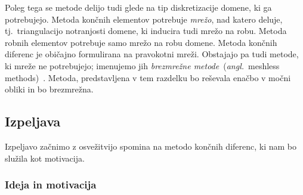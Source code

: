 \documentclass[12pt,a4paper,twoside]{article}
\theoremstyle{definition} %
\theoremstyle{plain} %
\numberwithin{equation}{section}
\newcommand{\ang}[1]{(\hspace{-1.5px}\textit{angl.}\ #1)}
\begin{document}
Poleg tega se metode delijo tudi glede na tip diskretizacije domene, ki ga potrebujejo. Metoda
končnih elementov potrebuje \emph{mrežo}, nad katero deluje, tj.\ triangulacijo notranjosti domene,
ki inducira tudi mrežo na robu. Metoda robnih elementov potrebuje samo mrežo na robu domene. Metoda
končnih diferenc je običajno formulirana na pravokotni mreži. Obstajajo pa tudi metode, ki mreže ne
potrebujejo; imenujemo jih \emph{brezmrežne metode}~\ang{meshless methods}~\cite{meshless_review}.
Metoda, predstavljena v tem razdelku bo reševala enačbo v močni obliki in bo brezmrežna.

\subsection{Izpeljava}

Izpeljavo začnimo z osvežitvijo spomina na metodo končnih diferenc, ki nam bo
služila kot motivacija.

\subsubsection{Ideja in motivacija}
\end{document}
